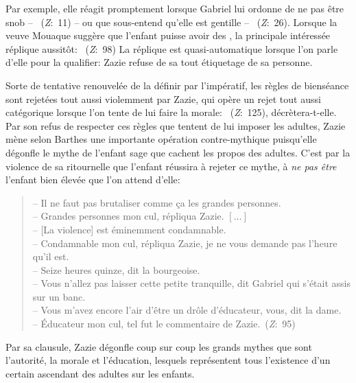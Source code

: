 Par exemple, elle réagit promptement lorsque Gabriel lui ordonne de ne pas être snob -- ~(\textit{Z}:~11) -- ou que  sous-entend qu'elle est gentille -- ~(\textit{Z}:~26).
Lorsque la veuve Mouaque suggère que l'enfant puisse avoir des , la principale intéressée réplique aussitôt: ~(\textit{Z}:~98)
La réplique est quasi-automatique lorsque l'on parle d'elle pour la qualifier: Zazie refuse de sa  tout étiquetage de sa personne.
\par
Sorte de tentative renouvelée de la définir par l'impératif, les règles de bienséance sont rejetées tout aussi violemment par Zazie, qui opère un rejet tout aussi catégorique lorsque l'on tente de lui faire la morale: ~(\textit{Z}:~125), décrètera-t-elle.
Par son refus de respecter ces règles que tentent de lui imposer les adultes, Zazie mène selon Barthes une importante opération contre-mythique puisqu'elle dégonfle le mythe de l'enfant sage que cachent les propos des adultes.
C'est par la violence de sa ritournelle  que l'enfant réussira à rejeter ce mythe, à \textit{ne pas être} l'enfant bien élevée que l'on attend d'elle:
\begin{quote}
  \begin{singlespace}
    \small
    -- Il ne faut pas brutaliser comme ça les grandes personnes. \\
    -- Grandes personnes mon cul, répliqua Zazie. $\left[ \dots \right]$ \\
    -- [La violence] est éminemment condamnable. \\
    -- Condamnable mon cul, répliqua Zazie, je ne vous demande pas l'heure qu'il est.\\
    -- Seize heures quinze, dit la bourgeoise. \\
    -- Vous n'allez pas laisser cette petite tranquille, dit Gabriel qui s'était assis sur un banc. \\
    -- Vous m'avez encore l'air d'être un drôle d'éducateur, vous, dit la dame. \\
    -- Éducateur mon cul, tel fut le commentaire de Zazie.~(\textit{Z}:~95)
    \normalsize
  \end{singlespace}
\end{quote}
Par sa clausule, Zazie dégonfle coup sur coup les grands mythes que sont l'autorité, la morale et l'éducation, lesquels représentent tous l'existence d'un certain ascendant des adultes sur les enfants.
